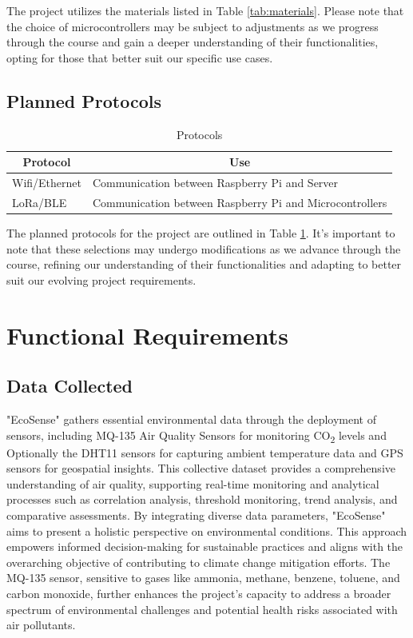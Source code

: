 \documentclass[conference]{IEEEtran}
\begin{document}
The project utilizes the materials listed in Table \ref{tab:materials}. Please note that the choice of microcontrollers may be subject to adjustments as we progress through the course and gain a deeper understanding of their functionalities, opting for those that better suit our specific use cases.

\subsection{Planned Protocols}

\begin{table}[htbp]
  \caption{Protocols}\label{tab:protocols}
  \centering
  \begin{tabular}[c]{l|p{4.5cm}}
      \hline
      \multicolumn{1}{c|}{\textbf{Protocol}} & 
      \multicolumn{1}{c}{\textbf{Use}} \\
      \hline
      Wifi/Ethernet & Communication between Raspberry Pi and Server \\
      \hline
      LoRa/BLE & Communication between Raspberry Pi and Microcontrollers \\
      \hline
    \end{tabular}
\end{table}

The planned protocols for the project are outlined in Table \ref{tab:protocols}. It's important to note that these selections may undergo modifications as we advance through the course, refining our understanding of their functionalities and adapting to better suit our evolving project requirements.

\section{Functional Requirements}

\subsection{Data Collected}

 "EcoSense" gathers essential environmental data through the deployment of sensors, including MQ-135 Air Quality Sensors for monitoring CO\textsubscript{2} levels and Optionally the DHT11 sensors for capturing ambient temperature data and GPS sensors for geospatial insights. This collective dataset provides a comprehensive understanding of air quality, supporting real-time monitoring and analytical processes such as correlation analysis, threshold monitoring, trend analysis, and comparative assessments. By integrating diverse data parameters, "EcoSense" aims to present a holistic perspective on environmental conditions. This approach empowers informed decision-making for sustainable practices and aligns with the overarching objective of contributing to climate change mitigation efforts. The MQ-135 sensor, sensitive to gases like ammonia, methane, benzene, toluene, and carbon monoxide, further enhances the project's capacity to address a broader spectrum of environmental challenges and potential health risks associated with air pollutants.
\end{document}
